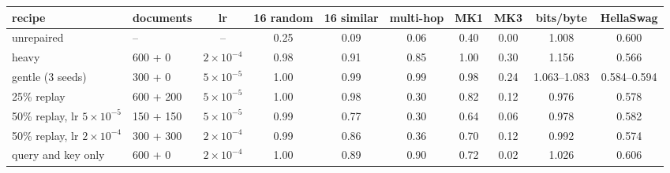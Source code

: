 \begin{tabular}{llcccccccc}
\toprule
recipe & documents & lr & 16 random & 16 similar & multi-hop & MK1 & MK3 & bits/byte & HellaSwag \\
\midrule
unrepaired & -- & -- & 0.25 & 0.09 & 0.06 & 0.40 & 0.00 & 1.008 & 0.600 \\
heavy & 600 + 0 & $2\times10^{-4}$ & 0.98 & 0.91 & 0.85 & 1.00 & 0.30 & 1.156 & 0.566 \\
gentle (3 seeds) & 300 + 0 & $5\times10^{-5}$ & 1.00 & 0.99 & 0.99 & 0.98 & 0.24 & 1.063--1.083 & 0.584--0.594 \\
25\% replay & 600 + 200 & $5\times10^{-5}$ & 1.00 & 0.98 & 0.30 & 0.82 & 0.12 & 0.976 & 0.578 \\
50\% replay, lr $5\times10^{-5}$ & 150 + 150 & $5\times10^{-5}$ & 0.99 & 0.77 & 0.30 & 0.64 & 0.06 & 0.978 & 0.582 \\
50\% replay, lr $2\times10^{-4}$ & 300 + 300 & $2\times10^{-4}$ & 0.99 & 0.86 & 0.36 & 0.70 & 0.12 & 0.992 & 0.574 \\
query and key only & 600 + 0 & $2\times10^{-4}$ & 1.00 & 0.89 & 0.90 & 0.72 & 0.02 & 1.026 & 0.606 \\
\bottomrule
\end{tabular}
